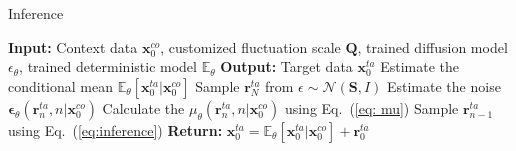 \begin{algorithm}[!t]
\caption{Inference}
\label{al: sampling}
\begin{algorithmic}[1]
    \State \textbf{Input:} Context data $\mathbf{x}_0^{co}$, customized fluctuation scale $\mathbf{Q}$, trained diffusion model $\epsilon_{\theta}$, trained deterministic model $\mathbb{E}_{\theta}$
    \State \textbf{Output:} Target data $\mathbf{x}_0^{ta}$
    \State Estimate the conditional mean \(\mathbb{E}_{\theta}[\mathbf{x}^{ta}_0|\mathbf{x}^{co}_0]\)
    \State Sample $\mathbf{r}_N^{ta}$ from $\epsilon \sim \mathcal{N}(\mathbf{S},I)$
        \State Estimate the noise $\mathbf{\epsilon}_{\theta}(\mathbf{r}_n^{ta}, n| \mathbf{x}_0^{co})$
        \State Calculate the $\mu_{\theta}(\mathbf{r}_n^{ta}, n| \mathbf{x}_0^{co})$ using Eq.~(\ref{eq: mu})
        \State Sample $\mathbf{r}_{n-1}^{ta}$ using Eq.~(\ref{eq:inference})
    \EndFor
    \State \textbf{Return:} $\mathbf{x}_0^{ta}=\mathbb{E}_{\theta}[\mathbf{x}^{ta}_0|\mathbf{x}^{co}_0]+\mathbf{r}_0^{ta}$
\end{algorithmic}

\end{algorithm}
